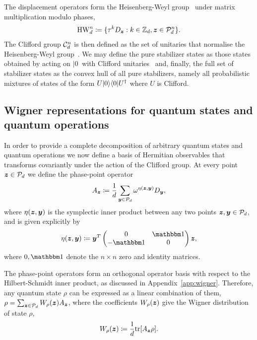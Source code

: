 \documentclass[pra,
aps,
twocolumn,
superscriptaddress,
groupedaddress,
nofootinbib,
reprint
]{revtex4-1}
\begin{document}
The displacement operators form the Heisenberg-Weyl group~\cite{Folland_1989, Bengtsson_2006} under matrix multiplication modulo phases,
\begin{equation}\label{eq:gp}
    {\rm{HW}}_d^n \coloneqq \{ \tau^k D_{\bmz}: k \in \mathbb{Z}_d, \bmz \in \cal{P}_d^n\}.
\end{equation}
The Clifford group $ \cal{C}_d^n $ is then defined as the set of unitaries that normalise the Heisenberg-Weyl group~\cite{Appleby_2005}. We may define the pure stabilizer states as those states obtained by acting on $|0\>$ with Clifford unitaries~\cite{cit:gross3} and, finally, the full set of stabilizer states as the convex hull of all pure stabilizers, namely all probabilistic mixtures of states of the form $U|0\>\<0|U^\dagger$ where $U$ is Clifford. 

\subsection{Wigner representations for quantum states and quantum operations}\label{sec:wigner}

In order to provide a complete decomposition of arbitrary quantum states and quantum operations we now define a basis of Hermitian observables that transforms covariantly under the action of the Clifford group. At every point $\bmz \in \P_d$ we define the phase-point operator
\begin{equation}\label{eq:ax}
	A_{\bmz} \coloneqq \frac{1}{d} \sum_{\bmy \in \cal{P}_d} \omega^{\eta(\bmz, \bmy)} D_{\bmy}, 
\end{equation}
where $\eta(\bmz, \y)$ is the symplectic inner product between any two points $\bmz,\y \in \P_d$, and is given explicitly by
\begin{equation}
	\eta(\bmz, \bmy) \coloneqq \bmy^T \begin{pmatrix}
		0  & \id \\ %
		-\id & 0 \\ %
	\end{pmatrix} \bmz,
\end{equation}
where $0, \id$ denote the $n\times n$ zero and identity matrices.

The phase-point operators form an orthogonal operator basis with respect to the Hilbert-Schmidt inner product, as discussed in Appendix~\ref{app:wigner}.
Therefore, any quantum state $\rho$ can be expressed as a linear combination of them, $\rho = \sum_{\bmz \in \cal{P}_d} \W[\bmz]{\rho} A_{\bmz}$, where the coefficients $\W{\rho}(\z)$ give the Wigner distribution of state $\rho$,
\begin{equation}\label{eq:wstate}
    \W[\bmz]{\rho} \coloneqq \frac{1}{d}\tr[A_{\bmz} \rho].
\end{equation}
\end{document}
